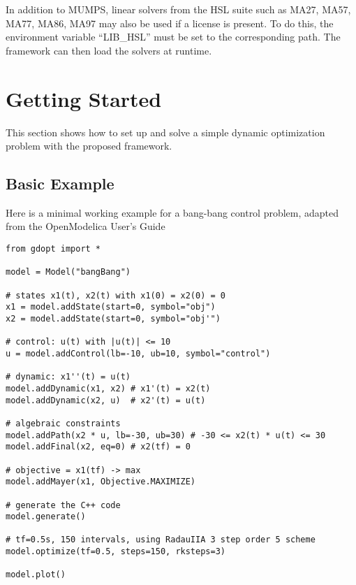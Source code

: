 \documentclass[12pt]{article}
\begin{document}
In addition to MUMPS, linear solvers from the HSL suite such as MA27, MA57,
MA77, MA86, MA97\cite{hsl2013collection} may also be used if a license is
present. To do this, the environment variable “LIB\_HSL” must be set to the
corresponding path. The framework can then load the solvers at runtime.

\section{Getting Started}
This section shows how to set up and solve a simple dynamic
optimization problem with the proposed framework.

\subsection{Basic Example}
Here is a minimal working example for a bang-bang control problem, adapted from
the OpenModelica User's Guide \cite{openmodelica}
\begin{lstlisting}
from gdopt import *

model = Model("bangBang")

# states x1(t), x2(t) with x1(0) = x2(0) = 0
x1 = model.addState(start=0, symbol="obj") 
x2 = model.addState(start=0, symbol="obj'")

# control: u(t) with |u(t)| <= 10
u = model.addControl(lb=-10, ub=10, symbol="control") 

# dynamic: x1''(t) = u(t)
model.addDynamic(x1, x2) # x1'(t) = x2(t)
model.addDynamic(x2, u)  # x2'(t) = u(t)

# algebraic constraints
model.addPath(x2 * u, lb=-30, ub=30) # -30 <= x2(t) * u(t) <= 30
model.addFinal(x2, eq=0) # x2(tf) = 0

# objective = x1(tf) -> max
model.addMayer(x1, Objective.MAXIMIZE) 

# generate the C++ code
model.generate() 

# tf=0.5s, 150 intervals, using RadauIIA 3 step order 5 scheme
model.optimize(tf=0.5, steps=150, rksteps=3)

model.plot()
	\end{lstlisting}
\end{document}
